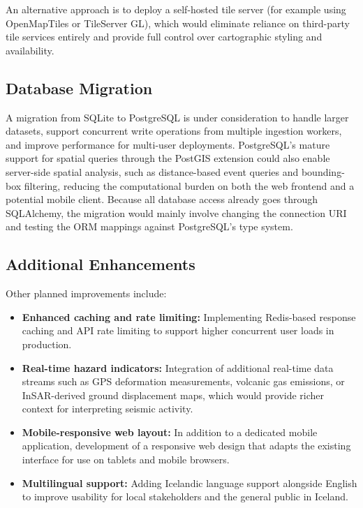 \documentclass[12pt]{article}
\begin{document}
An alternative approach is to deploy a self-hosted tile server (for example using OpenMapTiles or TileServer GL), which would eliminate reliance on third-party tile services entirely and provide full control over cartographic styling and availability.

\subsection{Database Migration}

A migration from SQLite to PostgreSQL is under consideration to handle larger datasets, support concurrent write operations from multiple ingestion workers, and improve performance for multi-user deployments. PostgreSQL's mature support for spatial queries through the PostGIS extension could also enable server-side spatial analysis, such as distance-based event queries and bounding-box filtering, reducing the computational burden on both the web frontend and a potential mobile client. Because all database access already goes through SQLAlchemy, the migration would mainly involve changing the connection URI and testing the ORM mappings against PostgreSQL's type system.

\subsection{Additional Enhancements}

Other planned improvements include:

\begin{itemize}
    \item \textbf{Enhanced caching and rate limiting:} Implementing Redis-based response caching and API rate limiting to support higher concurrent user loads in production.
    \item \textbf{Real-time hazard indicators:} Integration of additional real-time data streams such as GPS deformation measurements, volcanic gas emissions, or InSAR-derived ground displacement maps, which would provide richer context for interpreting seismic activity.
    \item \textbf{Mobile-responsive web layout:} In addition to a dedicated mobile application, development of a responsive web design that adapts the existing interface for use on tablets and mobile browsers.
    \item \textbf{Multilingual support:} Adding Icelandic language support alongside English to improve usability for local stakeholders and the general public in Iceland.
\end{itemize}
\end{document}
